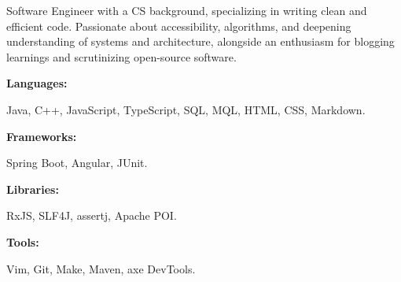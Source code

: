 \documentclass[9pt]{util} %
\begin{document}
\begin{minipage}[t]{0.475\textwidth}
	\vspace{-6pt}
	 
	Software Engineer with a CS background, specializing in writing clean and efficient code. Passionate about accessibility, algorithms, and deepening understanding of systems and architecture, alongside an enthusiasm for blogging learnings and scrutinizing open-source software.
	
\end{minipage}
\hfill %
\begin{minipage}[t]{0.475\textwidth}
	\vspace{-6pt}
	    
	\begin{minipage}[t]{0.2\textwidth}
		\textbf{Languages:}
	\end{minipage}
	\hfill
	\begin{minipage}[t]{0.73\textwidth}
		Java, C++, JavaScript, TypeScript, SQL, MQL, HTML, CSS, Markdown.  
	\end{minipage}
	\vspace{1mm}
	    
	\begin{minipage}[t]{0.2\textwidth}
		\textbf{Frameworks:}
	\end{minipage}
	\hfill
	\begin{minipage}[t]{0.73\textwidth}
		Spring Boot, Angular, JUnit.
	\end{minipage}
	\vspace{1mm}
	    
	\begin{minipage}[t]{0.2\textwidth}
		\textbf{Libraries:}
	\end{minipage}
	\hfill
	\begin{minipage}[t]{0.73\textwidth}
		RxJS, SLF4J, assertj, Apache POI.
	\end{minipage}
	\vspace{1mm}
	       
	\begin{minipage}[t]{0.2\textwidth}
		\textbf{Tools:}
	\end{minipage}
	\hfill
	\begin{minipage}[t]{0.73\textwidth}
		Vim, Git, Make, Maven, axe DevTools.
	\end{minipage}
	\vspace{1mm}
	    
\end{minipage}
\end{document}
